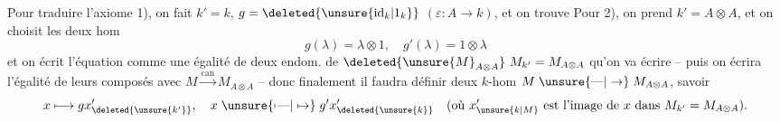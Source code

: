 Pour traduire l'axiome 1), on fait $k'=k$, $g=\deleted{\unsure{\mathrm{id}_k|1_k}}$ $(\varepsilon:A\longrightarrow k)$, et on trouve
Pour  2), on  prend $k'=A\otimes A$, et on choisit les deux hom
\[
 g(\lambda)=\lambda\otimes1,\quad g'(\lambda)=1\otimes\lambda
\]
et on écrit l'équation comme une égalité de deux endom. de $\deleted{\unsure{M}_{A\otimes A}}\ M_{k'}=M_{A\otimes A}$ qu'on va écrire -- puis on écrira l'égalité de leurs composés avec $M\overset{\mathrm{can}}{\longrightarrow}M_{A\otimes A}$ -- donc finalement il faudra définir deux $k$-hom $M\mathrel{\unsure{\text{---}|\to}}M_{A\otimes A}$, savoir
\[
 x\longmapsto gx'_{\deleted{\unsure{k'}}},\quad x\mathrel{\unsure{\mapstochar\text{---}|\mapsto}}g'x'_{\deleted{\unsure{k}}}
 \quad\text{(où }x'_{\unsure{k|M}}\text{ est l'image de }x\text{ dans }M_{k'}=M_{A\otimes A}\text{).}
\]

